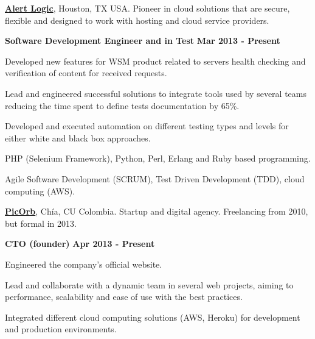 
\href{http://alertlogic.com/}{\textbf{Alert Logic}}, Houston, TX USA. Pioneer in
cloud solutions that are secure, flexible and designed to work with hosting and cloud service providers.
\begin{outerlist}
\item[] \textbf{Software Development Engineer and in Test} \hfill \textbf{Mar
2013 - Present}
    \begin{innerlist}
\item Developed new features for WSM product related to servers
health checking and verification of content for received requests.
\item Lead and engineered successful solutions to integrate tools
used by several teams reducing the time spent to define tests documentation by 65\%.
\item Developed and executed automation on different testing types and levels
for either white and black box approaches.
\item PHP (Selenium Framework), Python, Perl, Erlang and Ruby based programming.
\item Agile Software Development (SCRUM), Test Driven Development (TDD), cloud
computing (AWS).
    \end{innerlist}
\end{outerlist}

\quarterblankline

\href{http://www.picorb.com/}{\textbf{PicOrb}}, Ch\'ia, CU Colombia. Startup
and digital agency. Freelancing from 2010, but formal in 2013.
\begin{outerlist}
\item[] \textbf{CTO (founder)} \hfill \textbf{Apr 2013 -
Present}
    \begin{innerlist}
\item Engineered the company's official website.
\item Lead and collaborate with a dynamic team in several
web projects, aiming to performance, scalability and ease of use with
the best practices.
\item Integrated different cloud computing solutions (AWS, Heroku) for
development and production environments.
    \end{innerlist}
\end{outerlist}

\quarterblankline

